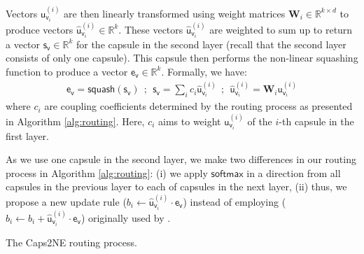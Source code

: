 \documentclass[sigconf]{acmart}
\begin{document}
Vectors $\boldsymbol{\mathsf{u}}_{\mathsf{v}_i}^{(i)}$ are then linearly transformed using weight matrices $\textbf{W}_{i} \in \mathbb{R}^{k\times d}$ to produce vectors $\hat{\boldsymbol{\mathsf{u}}}_{\mathsf{v}_i}^{(i)} \in \mathbb{R}^{k}$. 
These vectors $\hat{\boldsymbol{\mathsf{u}}}_{\mathsf{v}_i}^{(i)}$  are weighted to sum up to return a vector  $\boldsymbol{\mathsf{s}}_{\mathsf{v}} \in \mathbb{R}^{k}$ for the capsule in the second layer (recall that the second layer consists of only one  capsule).
This capsule then performs the non-linear squashing function to produce a vector $\boldsymbol{\mathsf{e}}_{\mathsf{v}} \in \mathbb{R}^{k}$. 
Formally, we have:
\begin{eqnarray}
\boldsymbol{\mathsf{e}}_{\mathsf{v}} = \mathsf{squash}\left(\boldsymbol{\mathsf{s}}_{\mathsf{v}}\right) \ \  ;   \ \ \boldsymbol{\mathsf{s}}_{\mathsf{v}} = \sum_{i} c_{i}\hat{\boldsymbol{\mathsf{u}}}_{\mathsf{v}_i}^{(i)} \ \ ;  \ \  \hat{\boldsymbol{\mathsf{u}}}_{\mathsf{v}_i}^{(i)} = \textbf{W}_{i} \boldsymbol{\mathsf{u}}_{\mathsf{v}_i}^{(i)} \end{eqnarray}
where $c_{i}$ are coupling coefficients determined by the routing process as presented in Algorithm \ref{alg:routing}. Here, 
$c_{i}$ aims to weight $\boldsymbol{\mathsf{u}}_{\mathsf{v}_i}^{(i)}$ of the $i$-th capsule in the first layer. 

As we use one capsule in the second layer, we make two differences in our routing process  in Algorithm \ref{alg:routing}: (i) we apply  $\mathsf{softmax}$ in a direction from all capsules in the previous layer to each of capsules in the next layer, 
(ii) thus, we propose a new update rule ($b_{i} \leftarrow \hat{\boldsymbol{\mathsf{u}}}_{\mathsf{v}_i}^{(i)}\cdot\boldsymbol{\mathsf{e}}_{\mathsf{v}}$) instead of employing ($b_{i} \leftarrow b_{i} + \hat{\boldsymbol{\mathsf{u}}}_{\mathsf{v}_i}^{(i)}\cdot\boldsymbol{\mathsf{e}}_{\mathsf{v}}$) originally used by  \citet{sabour2017dynamic}.

\begin{algorithm}
\caption{The Caps2NE routing process.}
\label{alg:routing}
\DontPrintSemicolon
\SetAlgoVlined
{}
\end{algorithm}
\end{document}
